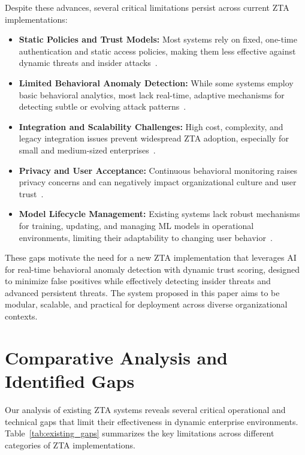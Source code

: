 \documentclass[conference]{IEEEtran}
\begin{document}
Despite these advances, several critical limitations persist across current ZTA implementations:
\begin{itemize}
    \item \textbf{Static Policies and Trust Models:} Most systems rely on fixed, one-time authentication and static access policies, making them less effective against dynamic threats and insider attacks~\cite{yadav2023behavioral, ahmadi2023identity, gambo2023systematic}.
    \item \textbf{Limited Behavioral Anomaly Detection:} While some systems employ basic behavioral analytics, most lack real-time, adaptive mechanisms for detecting subtle or evolving attack patterns~\cite{yadav2023behavioral, elsayed2023iot, hasan2023insider}.
    \item \textbf{Integration and Scalability Challenges:} High cost, complexity, and legacy integration issues prevent widespread ZTA adoption, especially for small and medium-sized enterprises~\cite{wang2023aws, gambo2023systematic, weinberg2023survey}.
    \item \textbf{Privacy and User Acceptance:} Continuous behavioral monitoring raises privacy concerns and can negatively impact organizational culture and user trust~\cite{yadav2023behavioral, ahmadi2023identity}.
    \item \textbf{Model Lifecycle Management:} Existing systems lack robust mechanisms for training, updating, and managing ML models in operational environments, limiting their adaptability to changing user behavior~\cite{obbu2023cloud, elsayed2023iot}.
\end{itemize}

These gaps motivate the need for a new ZTA implementation that leverages AI for real-time behavioral anomaly detection with dynamic trust scoring, designed to minimize false positives while effectively detecting insider threats and advanced persistent threats. The system proposed in this paper aims to be modular, scalable, and practical for deployment across diverse organizational contexts.

\section{Comparative Analysis and Identified Gaps}
Our analysis of existing ZTA systems reveals several critical operational and technical gaps that limit their effectiveness in dynamic enterprise environments. Table~\ref{tab:existing_gaps} summarizes the key limitations across different categories of ZTA implementations.
\end{document}
